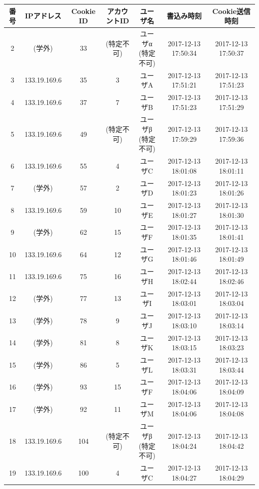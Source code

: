 \documentclass[10pt, a4paper]{jreport}
\begin{document}
\begin{table}[H]
\begin{center}
{\begin{tabular}{ | c | c | c | c | c | c | c | }
番号 & IPアドレス & Cookie ID & アカウントID & ユーザ名 & 書込み時刻 & Cookie送信時刻 \\ \hline
2 & (学外) & 33 & (特定不可) & \shortstack{ユーザα\\(特定不可)} & 2017-12-13 17:50:34 & 2017-12-13 17:50:37 \\ \hline
3 & 133.19.169.6 & 35 & 3 & ユーザA & 2017-12-13 17:51:21 & 2017-12-13 17:51:23 \\ \hline
4 & 133.19.169.6 & 37 & 7 & ユーザB & 2017-12-13 17:51:23 & 2017-12-13 17:51:29 \\ \hline
5 & 133.19.169.6 & 49 & (特定不可) & \shortstack{ユーザβ\\(特定不可)} & 2017-12-13 17:59:29 & 2017-12-13 17:59:36 \\ \hline
6 & 133.19.169.6 & 55 & 4 & ユーザC & 2017-12-13 18:01:08 & 2017-12-13 18:01:11 \\ \hline
7 & (学外) & 57 & 2 & ユーザD & 2017-12-13 18:01:23 & 2017-12-13 18:01:26 \\ \hline
8 & 133.19.169.6 & 59 & 10 & ユーザE & 2017-12-13 18:01:27 & 2017-12-13 18:01:30 \\ \hline
9 & (学外) & 62 & 15 & ユーザF & 2017-12-13 18:01:35 & 2017-12-13 18:01:41 \\ \hline
10 & 133.19.169.6 & 64 & 12 & ユーザG & 2017-12-13 18:01:46 & 2017-12-13 18:01:49 \\ \hline
11 & 133.19.169.6 & 75 & 16 & ユーザH & 2017-12-13 18:02:44 & 2017-12-13 18:02:46 \\ \hline
12 & (学外) & 77 & 13 & ユーザI & 2017-12-13 18:03:01 & 2017-12-13 18:03:04 \\ \hline
13 & (学外) & 78 & 9 & ユーザJ & 2017-12-13 18:03:10 & 2017-12-13 18:03:14 \\ \hline
14 & (学外) & 81 & 8 & ユーザK & 2017-12-13 18:03:15 & 2017-12-13 18:03:23 \\ \hline
15 & (学外) & 86 & 5 & ユーザL & 2017-12-13 18:03:31 & 2017-12-13 18:03:44 \\ \hline
16 & (学外) & 93 & 15 & ユーザF & 2017-12-13 18:04:06 & 2017-12-13 18:04:09 \\ \hline
17 & (学外) & 92 & 11 & ユーザM & 2017-12-13 18:04:06 & 2017-12-13 18:04:08 \\ \hline
18 & 133.19.169.6 & 104 & (特定不可) & \shortstack{ユーザβ\\(特定不可)} & 2017-12-13 18:04:24 & 2017-12-13 18:04:42 \\ \hline
19 & 133.19.169.6 & 100 & 4 & ユーザC & 2017-12-13 18:04:27 & 2017-12-13 18:04:29 \\ \hline

\end{tabular}}
\end{center}
\end{table}
\end{document}
